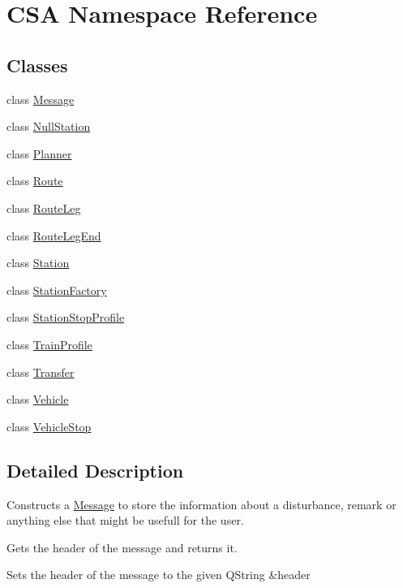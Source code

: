 \hypertarget{namespaceCSA}{}\section{C\+SA Namespace Reference}
\label{namespaceCSA}
\subsection*{Classes}
\begin{DoxyCompactItemize}
\item 
class \mbox{\hyperlink{classCSA_1_1Message}{Message}}
\item 
class \mbox{\hyperlink{classCSA_1_1NullStation}{Null\+Station}}
\item 
class \mbox{\hyperlink{classCSA_1_1Planner}{Planner}}
\item 
class \mbox{\hyperlink{classCSA_1_1Route}{Route}}
\item 
class \mbox{\hyperlink{classCSA_1_1RouteLeg}{Route\+Leg}}
\item 
class \mbox{\hyperlink{classCSA_1_1RouteLegEnd}{Route\+Leg\+End}}
\item 
class \mbox{\hyperlink{classCSA_1_1Station}{Station}}
\item 
class \mbox{\hyperlink{classCSA_1_1StationFactory}{Station\+Factory}}
\item 
class \mbox{\hyperlink{classCSA_1_1StationStopProfile}{Station\+Stop\+Profile}}
\item 
class \mbox{\hyperlink{classCSA_1_1TrainProfile}{Train\+Profile}}
\item 
class \mbox{\hyperlink{classCSA_1_1Transfer}{Transfer}}
\item 
class \mbox{\hyperlink{classCSA_1_1Vehicle}{Vehicle}}
\item 
class \mbox{\hyperlink{classCSA_1_1VehicleStop}{Vehicle\+Stop}}
\end{DoxyCompactItemize}


\subsection{Detailed Description}
Constructs a \mbox{\hyperlink{classCSA_1_1Message}{Message}} to store the information about a disturbance, remark or anything else that might be usefull for the user.

Gets the header of the message and returns it.

Sets the header of the message to the given Q\+String \&header

